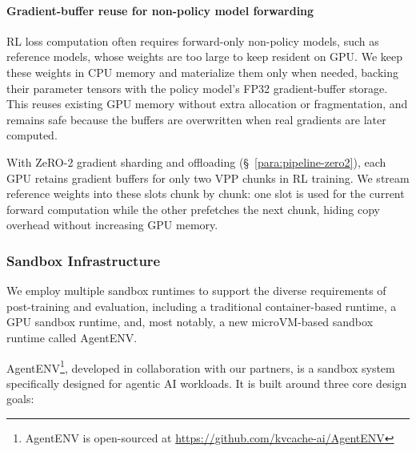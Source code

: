 \paragraph{Gradient-buffer reuse for non-policy model forwarding}
RL loss computation often requires forward-only non-policy models, such as reference models, whose weights are too large to keep resident on GPU.
We keep these weights in CPU memory and materialize them only when needed, backing their parameter tensors with the policy model's FP32 gradient-buffer storage.
This reuses existing GPU memory without extra allocation or fragmentation, and remains safe because the buffers are overwritten when real gradients are later computed.

With ZeRO-2 gradient sharding and offloading (\S~\ref{para:pipeline-zero2}), each GPU retains gradient buffers for only two VPP chunks in  RL training.
We stream reference weights into these slots chunk by chunk: one slot is used for the current forward computation while the other prefetches the next chunk, hiding copy overhead without increasing GPU memory.

\subsubsection{Sandbox Infrastructure}
\label{sec:sandbox}

We employ multiple sandbox runtimes to support the diverse requirements of  post-training and evaluation, including a traditional container-based runtime, a GPU sandbox runtime, and, most notably, a new microVM-based sandbox runtime called AgentENV.

AgentENV\footnote{AgentENV is open-sourced at \url{https://github.com/kvcache-ai/AgentENV}}, developed in collaboration with our partners, is a sandbox system specifically designed for agentic AI workloads.
It is built around three core design goals:

